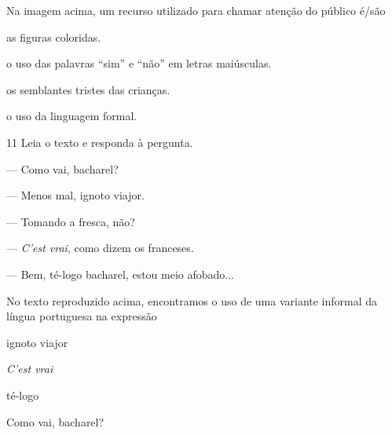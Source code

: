 
Na imagem acima, um recurso utilizado para chamar atenção do público é/são

\begin{escolha}
  \item as figuras coloridas.

  \item o uso das palavras ``sim'' e ``não'' em letras maiúsculas.

  \item os semblantes tristes das crianças.

  \item o uso da linguagem formal.
\end{escolha}

\pagebreak
\num{11} Leia o texto e responda à pergunta.

\begin{myquote}
\textit{}

--- Como vai, bacharel?

--- Menos mal, ignoto viajor.

--- Tomando a fresca, não?

--- \textit{C'est vrai}, como dizem os franceses.

--- Bem, té-logo bacharel, estou meio afobado...

\end{myquote}

No texto reproduzido acima, encontramos o uso de uma variante informal
da língua portuguesa na expressão

\begin{multicols}{2}
\begin{escolha}
  \item ignoto viajor 

  \item \textit{C'est vrai}

  \item té-logo

  \item Como vai, bacharel?
\end{escolha}
\end{multicols}


